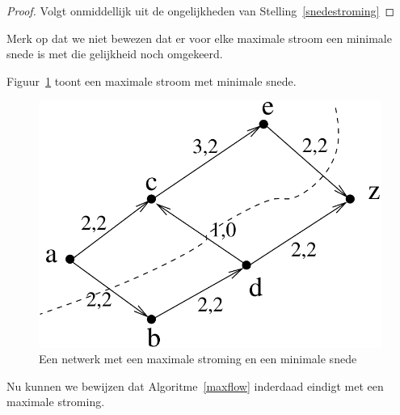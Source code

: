 \begin{proof}
Volgt onmiddellijk uit de ongelijkheden van Stelling~\ref{snedestroming}
\end{proof}



Merk op dat we niet bewezen dat er voor elke maximale stroom een
minimale snede is met die gelijkheid
noch omgekeerd.



Figuur~\ref{snede2} toont een maximale stroom met minimale snede.

\begin{figure}[ht]
\begin{center}
\includegraphics[width=0.35\linewidth,keepaspectratio]{snede2} %
\end{center}
\caption{Een netwerk met een maximale stroming en een minimale snede\label{snede2}}
\end{figure}




Nu kunnen we bewijzen dat Algoritme~\ref{maxflow} inderdaad eindigt
met een maximale stroming.



